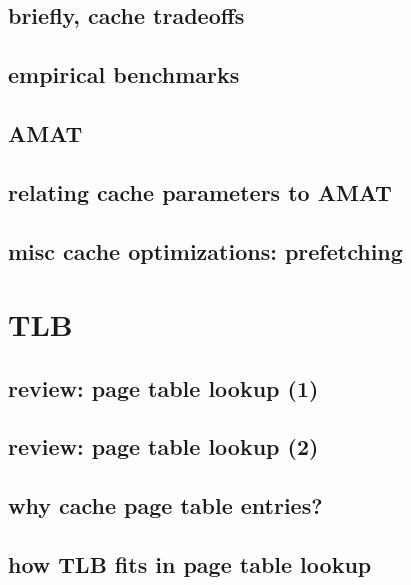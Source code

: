 \subsection{briefly, cache tradeoffs}



\subsection{empirical benchmarks}


\subsection{AMAT}




\subsection{relating cache parameters to AMAT}



\subsection{misc cache optimizations: prefetching}


\section{TLB}

\subsection{review: page table lookup (1)}


\subsection{review: page table lookup (2)}

\subsection{why cache page table entries?}


\subsection{how TLB fits in page table lookup}


